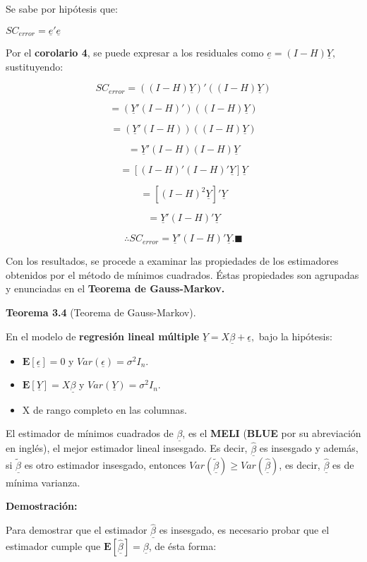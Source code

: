 \documentclass[
  a4paper,
  oneside,
  openany]{book}
\begin{document}
Se sabe por hipótesis que:

\(SC_{error}=\underline{e}'\underline{e}\)

Por el \textbf{corolario 4}, se puede expresar a los residuales como \(\underline{e}=(I-H)\underline{Y},\) sustituyendo:

\[SC_{error}=((I-H)\underline{Y})'((I-H)\underline{Y})\]

\[=(\underline{Y}'(I-H)')((I-H)\underline{Y})\]

\[=(\underline{Y}'(I-H))((I-H)\underline{Y})\]

\[=\underline{Y}'(I-H)(I-H)\underline{Y}\]

\[=[(I-H)'(I-H)'\underline{Y}]\underline{Y}\]

\[=[(I-H)^2\underline{Y}]'\underline{Y}\]

\[=\underline{Y}'(I-H)'\underline{Y}\]

\[\therefore SC_{error}=\underline{Y}'(I-H)'\underline{Y}. \blacksquare\]

Con los resultados, se procede a examinar las propiedades de los estimadores obtenidos por el método de mínimos cuadrados.
Éstas propiedades son agrupadas y enunciadas en el \textbf{Teorema de Gauss-Markov.}

\textbf{Teorema 3.4} (Teorema de Gauss-Markov).

En el modelo de \textbf{regresión lineal múltiple} \(\underline{Y}=X \underline{\beta}+ \underline{\epsilon},\) bajo la hipótesis:

\begin{itemize}
\item
  \(\mathbf{E}[\underline{\epsilon}]=0\) y \(Var(\underline{\epsilon})=\sigma^2I_{n}.\)
\item
  \(\mathbf{E}[\underline{Y}]=X \underline{\beta}\) y \(Var(\underline{Y})=\sigma^2I_{n}.\)
\item
  X de rango completo en las columnas.
\end{itemize}

El estimador de mínimos cuadrados de \(\underline{\beta}\), es el \textbf{MELI} (\textbf{BLUE} por su abreviación en inglés), el mejor estimador lineal insesgado. Es decir, \(\underline{\hat{\beta}}\) es insesgado y además, si \(\underline{\tilde{\beta}}\) es otro estimador insesgado, entonces \(Var(\underline{\tilde{\beta}})\geq Var(\underline{\hat{\beta}})\), es decir, \(\underline{\hat{\beta}}\) es de mínima varianza.

\textbf{Demostración:}

Para demostrar que el estimador \(\underline{\hat{\beta}}\) es insesgado, es necesario probar que el estimador cumple que \(\mathbf{E}[\underline{\hat{\beta}}]=\underline{\beta}\), de ésta forma:
\end{document}
